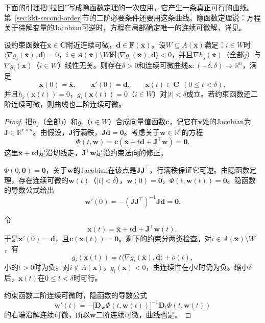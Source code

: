 下面的引理把“拉回”写成隐函数定理的一次应用，它产生一条真正可行的曲线。第~\ref{sec:kkt-second-order}节的二阶必要条件还要用这条曲线。隐函数定理说：方程关于待解变量的Jacobian可逆时，方程在局部确定唯一的连续可微解，详见。

\begin{lemma}[沿线性化方向的可行曲线]
\label{lem:kkt-feasible-curve}
设约束函数在$\bar{\bm{x}}\in\bm{C}$附近连续可微，$\bm{d}\in\bm{F}(\bar{\bm{x}})$。设$W\subseteq A(\bar{\bm{x}})$满足：$i\in W$时$\langle\nabla g_i(\bar{\bm{x}}),\bm{d}\rangle=0$，$i\in A(\bar{\bm{x}})\setminus W$时$\langle\nabla g_i(\bar{\bm{x}}),\bm{d}\rangle<0$，并且$\nabla h_j(\bar{\bm{x}})$（全部$j$）与$\nabla g_i(\bar{\bm{x}})$（$i\in W$）线性无关。则存在$\delta>0$和连续可微曲线$\bm{x}:(-\delta,\delta)\to\mathbb{R}^n$，满足
\begin{equation}
 \bm{x}(0)=\bar{\bm{x}},\qquad\bm{x}'(0)=\bm{d},\qquad\bm{x}(t)\in\bm{C}\ \ (0\leq t<\delta),
 \label{eq:kkt-feasible-curve}
\end{equation}
并且$h_j(\bm{x}(t))=0$，$g_i(\bm{x}(t))=0$（$i\in W$）对$\lvert t\rvert<\delta$成立。若约束函数还二阶连续可微，则曲线也二阶连续可微。
\end{lemma}

\begin{proof}
把$h_j$（全部$j$）和$g_i$（$i\in W$）合成向量值函数$\bm{c}$，记它在$\bar{\bm{x}}$处的Jacobian为$\bm{J}\in\mathbb{R}^{r\times n}$。由假设，$\bm{J}$行满秩，$\bm{J}\bm{d}=\bm{0}$。考虑关于$\bm{w}\in\mathbb{R}^r$的方程
\[
 \Phi(t,\bm{w})=\bm{c}(\bar{\bm{x}}+t\bm{d}+\bm{J}^\top\bm{w})=\bm{0}.
\]
这里$\bar{\bm{x}}+t\bm{d}$是沿切线走，$\bm{J}^\top\bm{w}$是沿约束法向的修正。

$\Phi(0,\bm{0})=\bm{0}$，关于$\bm{w}$的Jacobian在该点是$\bm{J}\bm{J}^\top$，行满秩保证它可逆。由隐函数定理，存在连续可微的$\bm{w}(t)$（$\lvert t\rvert<\delta$），$\bm{w}(0)=\bm{0}$，$\Phi(t,\bm{w}(t))=\bm{0}$。隐函数的导数公式给出
\[
 \bm{w}'(0)=-(\bm{J}\bm{J}^\top)^{-1}\bm{J}\bm{d}=\bm{0}.
\]

令
\[
 \bm{x}(t)=\bar{\bm{x}}+t\bm{d}+\bm{J}^\top\bm{w}(t),
\]
于是$\bm{x}'(0)=\bm{d}$，且$\bm{c}(\bm{x}(t))=\bm{0}$。剩下的约束分两类检查。对$i\in A(\bar{\bm{x}})\setminus W$，有
\[
 g_i(\bm{x}(t))=t\langle\nabla g_i(\bar{\bm{x}}),\bm{d}\rangle+o(t),
\]
小的$t>0$时为负。对$i\notin A(\bar{\bm{x}})$，$g_i(\bar{\bm{x}})<0$，由连续性在小$t$时仍为负。缩小$\delta$后，$\bm{x}(t)$在$0\leq t<\delta$时可行。

约束函数二阶连续可微时，隐函数的导数公式
\[
 \bm{w}'(t)=-\bigl[\bm{D}_{\bm{w}}\Phi(t,\bm{w}(t))\bigr]^{-1}\bm{D}_t\Phi(t,\bm{w}(t))
\]
的右端沿解连续可微，所以$\bm{w}$二阶连续可微，曲线也是。
\end{proof}

